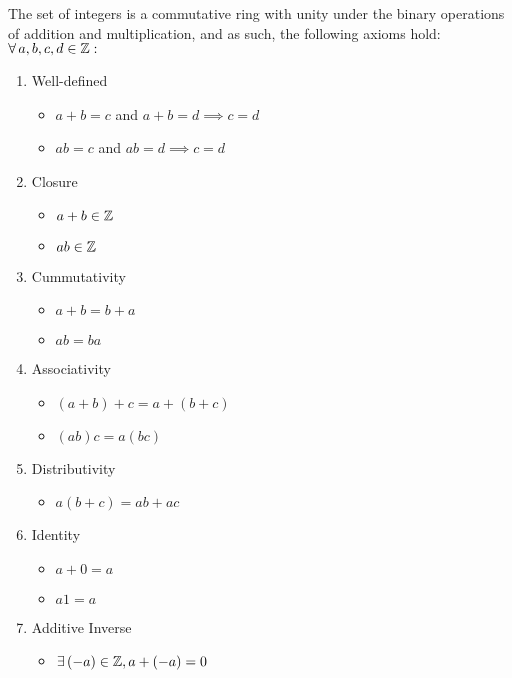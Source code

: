 \documentclass[letterpaper,12pt,fleqn]{article}
\begin{document}
\begin{properties}
  The set of integers is a commutative ring with unity under the binary
  operations of addition and multiplication, and as such, the following axioms
  hold:
\newpage
  $\forall\,a,b,c,d\in\mathbb{Z}:$

  \begin{enumerate}
  \item{Well-defined}
    \begin{itemize}
    \item $a+b=c$ and $a+b=d\implies c=d$
    \item $ab=c$ and $ab=d\implies c=d$
    \end{itemize}
    
  \item{Closure}
    \begin{itemize}
    \item $a+b\in\mathbb{Z}$
    \item $ab\in\mathbb{Z}$
    \end{itemize}
    
  \item{Cummutativity}
    \begin{itemize}
    \item $a+b=b+a$
    \item $ab=ba$
    \end{itemize}

  \item{Associativity}
    \begin{itemize}
    \item $(a+b)+c=a+(b+c)$
    \item $(ab)c=a(bc)$
    \end{itemize}
    
  \item{Distributivity}
    \begin{itemize}
    \item $a(b+c)=ab+ac$
    \end{itemize}

  \item{Identity}
    \begin{itemize}
    \item $a+0=a$
    \item $a1=a$
    \end{itemize}

  \item{Additive Inverse}
    \begin{itemize}
    \item $\exists\,(-a)\in\mathbb{Z},a+(-a)=0$
    \end{itemize}
  \end{enumerate}
\end{properties}
\end{document}
